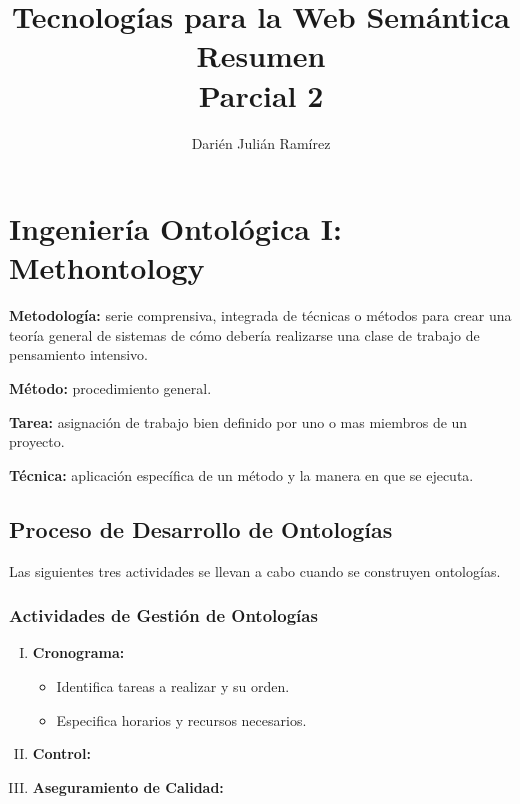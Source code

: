 \documentclass[a4paper,10pt,spanish,oneside]{article}
\title{\Huge\usefont{T1}{lmss}{b}{n} Tecnologías para la Web Semántica \\
			 Resumen \\
			 Parcial 2}
\author{Darién Julián Ramírez}
\date{}
\begin{document}
\maketitle %

\tableofcontents %

\cleardoublepage %

\section{Ingeniería Ontológica I: Methontology}

\textbf{Metodología:} serie comprensiva, integrada de técnicas o métodos para crear una teoría general de sistemas de cómo debería realizarse una clase de trabajo de pensamiento intensivo.

\textbf{Método:} procedimiento general.

\textbf{Tarea:} asignación de trabajo bien definido por uno o mas miembros de un proyecto.

\textbf{Técnica:} aplicación específica de un método y la manera en que se ejecuta.

\subsection{Proceso de Desarrollo de Ontologías}

Las siguientes tres actividades se llevan a cabo cuando se construyen ontologías.

\subsubsection{Actividades de Gestión de Ontologías}

\begin{enumerate}[I.]

\item \textbf{Cronograma:}
	
	\begin{itemize}
	\item Identifica tareas a realizar y su orden.
	\item Especifica horarios y recursos necesarios.
	\end{itemize}

\item \textbf{Control:}

\item \textbf{Aseguramiento de Calidad:}

\end{enumerate}
\end{document}
